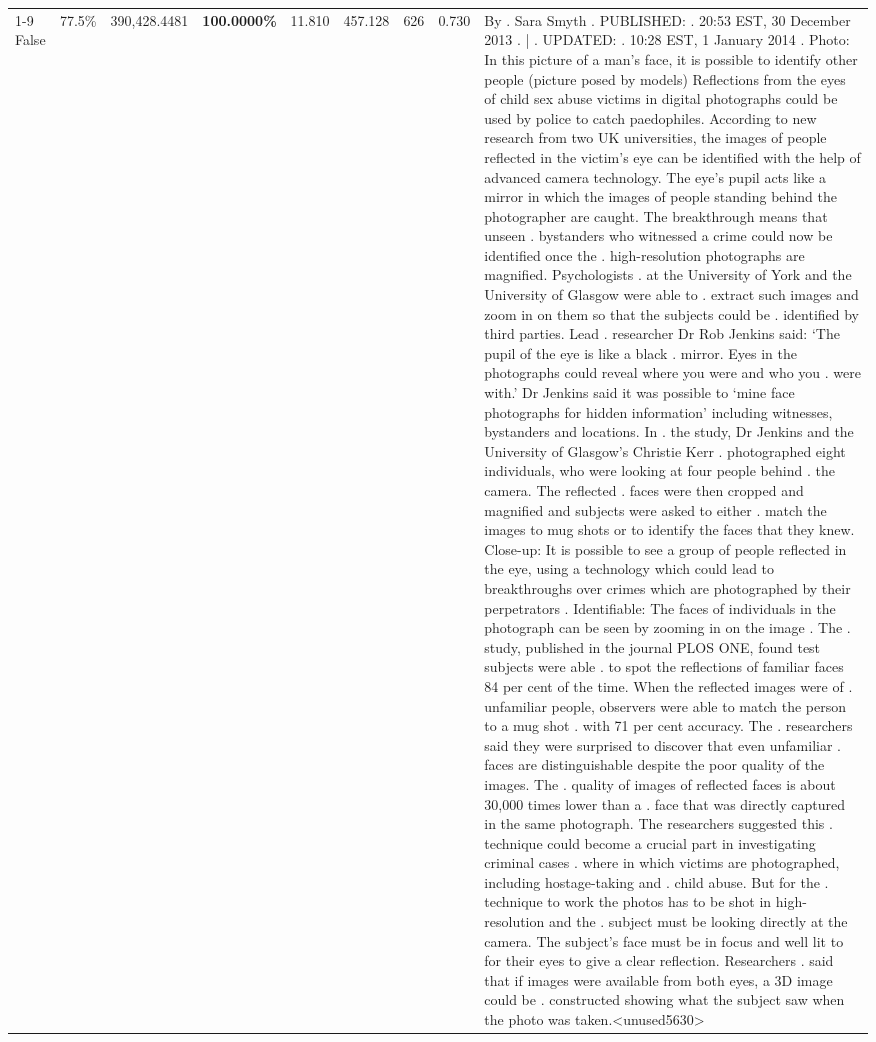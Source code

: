 \begin{table}[H]
\begin{tabular}{lllrlllll}
\cline{1-9}
False & 77.5\% & 390,428.4481 & \bfseries \color{red} 100.0000\% & 11.810 & 457.128 & 626 & 0.730 & By . Sara Smyth . PUBLISHED: . 20:53 EST, 30 December 2013 . | . UPDATED: . 10:28 EST, 1 January 2014 . Photo: In this picture of a man's face, it is possible to identify other people (picture posed by models) Reflections from the eyes of child sex abuse victims in digital photographs could be used by police to catch paedophiles. According to new research from two UK universities, the images of people reflected in the victim's eye can be identified with the help of advanced camera technology. The eye's pupil acts like a mirror in which the images of people standing behind the photographer are caught. The breakthrough means that unseen . bystanders who witnessed a crime could now be identified once the . high-resolution photographs are magnified. Psychologists . at the University of York and the University of Glasgow were able to . extract such images and zoom in on them so that the subjects could be . identified by third parties. Lead . researcher Dr Rob Jenkins said: ‘The pupil of the eye is like a black . mirror. Eyes in the photographs could reveal where you were and who you . were with.' Dr Jenkins said it was possible to ‘mine face photographs for hidden information' including witnesses, bystanders and locations. In . the study, Dr Jenkins and the University of Glasgow's Christie Kerr . photographed eight individuals, who were looking at four people behind . the camera. The reflected . faces were then cropped and magnified and subjects were asked to either . match the images to mug shots or to identify the faces that they knew. Close-up: It is possible to see a group of people reflected in the eye, using a technology which could lead to breakthroughs over crimes which are photographed by their perpetrators . Identifiable: The faces of individuals in the photograph can be seen by zooming in on the image . The . study, published in the journal PLOS ONE, found test subjects were able . to spot the reflections of familiar faces 84 per cent of the time. When the reflected images were of . unfamiliar people, observers were able to match the person to a mug shot . with 71 per cent accuracy. The . researchers said they were surprised to discover that even unfamiliar . faces are distinguishable despite the poor quality of the images. The . quality of images of reflected faces is about 30,000 times lower than a . face that was directly captured in the same photograph. The researchers suggested this . technique could become a crucial part in investigating criminal cases . where in which victims are photographed, including hostage-taking and . child abuse. But for the . technique to work the photos has to be shot in high-resolution and the . subject must be looking directly at the camera. The subject's face must be in focus and well lit to for their eyes to give a clear reflection. Researchers . said that if images were available from both eyes, a 3D image could be . constructed showing what the subject saw when the photo was taken.<unused5630> \\

\end{tabular}
\end{table}
